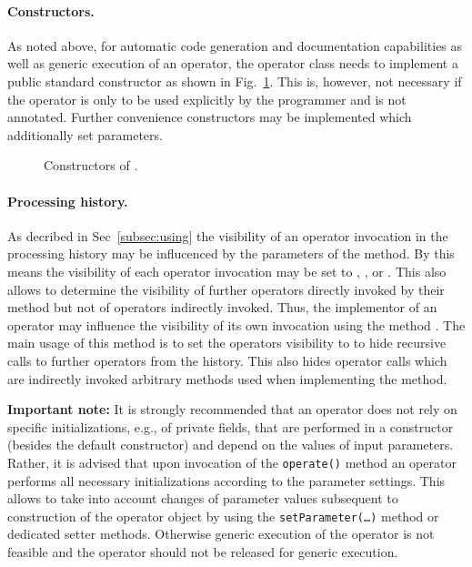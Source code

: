 \paragraph{Constructors.}
As noted above, 
for automatic code generation and documentation capabilities as well as generic execution 
of an operator,
the operator class needs to implement 
a public standard constructor 
as shown in Fig.~\ref{exa:constructor}.
This is, however, not necessary if the operator is only to be used explicitly
by the programmer and is not annotated.
Further convenience constructors may be implemented which additionally set
parameters.

\begin{figure}

\caption{\label{exa:constructor}Constructors of .}
\end{figure}

\paragraph{Processing history.}
As decribed in Sec~\ref{subsec:using} the visibility of an operator invocation in the
processing history may be
influcenced by the parameters of the   method.
By this means the visibility of each operator invocation may be set to
, , or .
This also allows to determine the visibility of further operators directly
invoked by their  method but not of operators indirectly invoked.
Thus, the implementor of an operator may influence the visibility
of its own invocation using the method .
The main usage of this method is to set the operators visibility to 
to hide recursive calls to further operators from the history.
This also hides operator calls which are indirectly invoked arbitrary methods used when implementing
the  method.

\textbf{Important note:} It is strongly recommended that an operator
does not rely on specific initializations, e.g., of private fields, that are
performed in a constructor (besides the default constructor)
and depend on the values of input parameters. Rather,
it is advised that upon invocation of the \texttt{operate()} method an operator performs all necessary initializations according to the parameter settings.
This allows to take into account changes of parameter values subsequent to
construction of the operator object by using the \texttt{setParameter(\ldots)}
method or dedicated setter methods.
Otherwise generic execution of the operator is not feasible and
the operator should not be released for generic execution.

